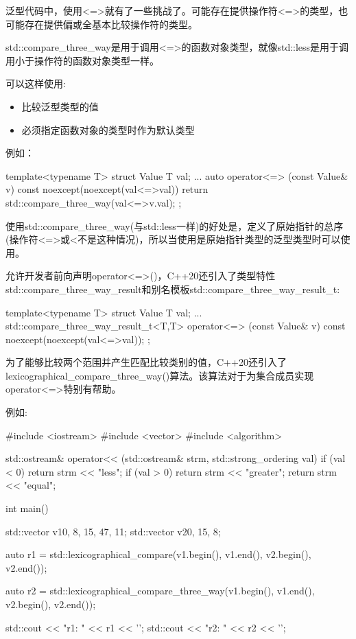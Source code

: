 
泛型代码中，使用<=>就有了一些挑战了。可能存在提供操作符<=>的类型，也可能存在提供偏或全基本比较操作符的类型。


std::compare\_three\_way是用于调用<=>的函数对象类型，就像std::less是用于调用小于操作符的函数对象类型一样。

可以这样使用:

\begin{itemize}
\item
比较泛型类型的值

\item
必须指定函数对象的类型时作为默认类型
\end{itemize}

例如：

\begin{cpp}
template<typename T>
struct Value {
	T val{};
	...
	auto operator<=> (const Value& v) const noexcept(noexcept(val<=>val)) {
		return std::compare_three_way{}(val<=>v.val);
	}
};
\end{cpp}

使用std::compare\_three\_way(与std::less一样)的好处是，定义了原始指针的总序(操作符<=>或<不是这种情况)，所以当使用是原始指针类型的泛型类型时可以使用。

允许开发者前向声明operator<=>()，C++20还引入了类型特性std::compare\_three\_way\_result和别名模板std::compare\_three\_way\_result\_t:

\begin{cpp}
template<typename T>
struct Value {
	T val{};
	...
	std::compare_three_way_result_t<T,T>
		operator<=> (const Value& v) const noexcept(noexcept(val<=>val));
};
\end{cpp}


为了能够比较两个范围并产生匹配比较类别的值，C++20还引入了lexicographical\_compare\_three\_way()算法。该算法对于为集合成员实现operator<=>特别有帮助。

例如:


\begin{cpp}
#include <iostream>
#include <vector>
#include <algorithm>

std::ostream& operator<< (std::ostream& strm, std::strong_ordering val)
{
	if (val < 0) return strm << "less";
	if (val > 0) return strm << "greater";
	return strm << "equal";
}

int main()
{
	std::vector v1{0, 8, 15, 47, 11};
	std::vector v2{0, 15, 8};
	
	auto r1 = std::lexicographical_compare(v1.begin(), v1.end(),
										   v2.begin(), v2.end());
										   
	auto r2 = std::lexicographical_compare_three_way(v1.begin(), v1.end(),
													 v2.begin(), v2.end());
													 
	std::cout << "r1: " << r1 << '\n';
	std::cout << "r2: " << r2 << '\n';
}
\end{cpp}

